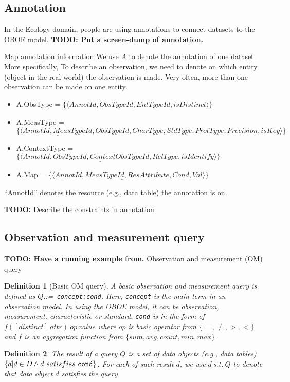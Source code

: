 \documentclass[conference]{IEEEtran}
\newtheorem{definition}{Definition}[section]
\begin{document}
\subsection{Annotation}
In the Ecology domain, people are using annotations to connect
datasets to the OBOE model. 
{\bf TODO: Put a screen-dump of annotation.}

Map annotation information 
We use $A$ to denote the annotation of one dataset. 
More specifically,
To describe an observation, we need to denote on which entity (object in the
real world) the observation is made.
Very often, more than one observation can be made on one entity.   
\begin{itemize}
\item A.ObsType = $\{\langle \underline{AnnotId,ObsTypeId}, EntTypeId,
  isDistinct \rangle\}$ 
\item A.MeasType = $\{\langle \underline{AnnotId, MeasTypeId}, ObsTypeId,
  CharType, StdType, ProtType, Precision, isKey \rangle\}$ 
\item A.ContextType = $\{\langle \underline{AnnotId, ObsTypeId, ContextObsTypeId, RelType}, isIdentify\rangle\}$
\item A.Map = $\{\langle \underline{AnnotId,MeasTypeId, ResAttribute, Cond}, Val\rangle\}$
\end{itemize}

``AnnotId'' denotes the resource (e.g., data table) the annotation is on.

{\bf TODO:} Describe the constraints in annotation

\subsection{Observation and measurement query}

{\bf TODO: Have a running example from.}
Observation and measurement (OM) query

\begin{definition}[Basic OM query]\label{def:basic_omq}
A basic observation and measurement query is defined as $Q$::={\tt
  concept:cond}. 
Here, {\tt concept} is the main term in an observation model. 
In using the OBOE model, it can be observation, measurement,
characteristic or standard. 
{\tt cond} is in the form of $f([distinct]~attr)~op~value$ where $op$ is
basic operator from $\{=, \neq, >, <\}$ and $f$ is an
aggregation function from $\{sum, avg, count, min, max\}$. 
\end{definition}

\begin{definition}\label{def:qresult}
The result of a query $Q$ is a set of data objects (e.g., data tables) 
$\{d|d\in D \wedge d~satisfies~{\tt cond}\}$. 
For each of such result $d$, we use $d~s.t.~Q$ to denote that
data object $d$ satisfies the query. 
\end{definition}
 
\end{document}
